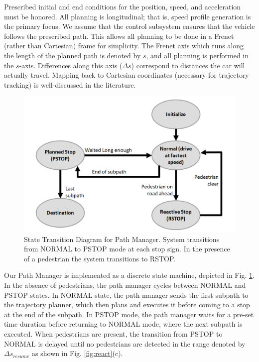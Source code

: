 \documentclass[letterpaper, 10 pt, conference]{ieeeconf}  %
\begin{document}
Prescribed initial and end conditions for the position, speed, and acceleration must be honored.
All planning is longitudinal; that is, speed profile generation is the primary focus. We assume that the control subsystem ensures that the vehicle follows the prescribed path.
This allows all planning to be done in a Frenet (rather than Cartesian) frame for simplicity.
The Frenet axis which runs along the length of the planned path is denoted by $s$, and all planning is performed in the $s$-axis.
Differences along this axis ($\Delta s$) correspond to distances the car will actually travel.
Mapping back to Cartesian coordinates (necessary for trajectory tracking) is well-discussed in the literature.

\begin{figure}[tb]
  \centering
  \includegraphics[width=0.9\columnwidth]{graphics/state_transition.PNG}
  \caption{State Transition Diagram for Path Manager. System transitions from NORMAL to PSTOP mode at each stop sign. In the presence of a pedestrian the system transitions to RSTOP.}
  \label{fig:st}
\end{figure}

Our Path Manager is implemented as a discrete state machine, depicted in Fig. \ref{fig:st}.
In the absence of pedestrians, the path manager cycles between NORMAL and PSTOP states.
In NORMAL state, the path manager sends the first subpath to the trajectory planner, which then plans and executes it before coming to a stop at the end of the subpath.
In PSTOP mode, the path manager waits for a pre-set time duration before returning to NORMAL mode, where the next subpath is executed.
When pedestrians are present, the transition from PSTOP to NORMAL is delayed until no pedestrians are detected in the range denoted by $\Delta s_{resume}$ as shown in Fig. \ref{fig:react}(c).
\end{document}
